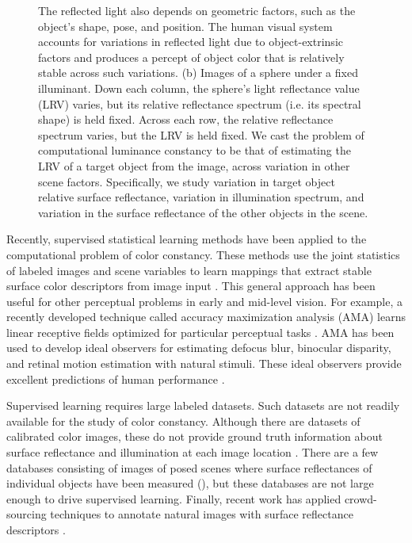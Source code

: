\documentclass{jov}
\begin{document}
\begin{figure}
{The reflected light also depends on geometric factors, such as the object's shape, pose, and position. 
The human visual system accounts for variations in reflected light due to object-extrinsic factors and produces a percept of object color that is relatively stable across such variations. 
(b) Images of a sphere under a fixed illuminant.  
Down each column, the sphere's light reflectance value (LRV) varies, but its relative reflectance spectrum (i.e. its spectral shape) is held fixed.
Across each row, the relative reflectance spectrum varies, but the LRV is held fixed.
We cast the problem of computational luminance constancy to be that of estimating the LRV of a target object from the image, across variation in other scene factors. 
Specifically, we study variation in target object relative surface reflectance, variation in illumination spectrum, and variation in the surface reflectance of the other objects in the scene.}
 \end{figure}

Recently, supervised statistical learning methods have been applied to the computational problem of color constancy.
These methods use the joint statistics of labeled images and scene variables to learn mappings that extract stable surface color descriptors from image input \cite{barron2015convolutional}.
This general approach has been useful for other perceptual problems in early and mid-level vision.
For example, a recently developed technique called accuracy maximization analysis (AMA) learns linear receptive fields optimized for particular perceptual tasks \cite{geisler2009optimal,burge2017accuracy,jaini2017linking}. AMA has been used to develop ideal observers for estimating defocus blur, binocular disparity, and retinal motion estimation with natural stimuli. These ideal observers provide excellent predictions of human performance \cite{burge2011optimal, burge2012optimal, burge2014optimal, burge2015optimal}.

Supervised learning requires large labeled datasets.  Such datasets are not readily available for the study of color constancy. Although there are datasets of calibrated color images, these do not provide ground truth information about surface reflectance and illumination at each image location \cite{ChakrabartiHyperspectral,NascimentoFoster2016,ParragaHyperspectralData,TkacikUpennHypersepctralData,skauli2013collection,olmos2004biologically}. There are a few databases consisting of images of posed scenes where surface reflectances of individual objects have been measured (), but these databases are not large enough to drive supervised learning. Finally, recent work has applied crowd-sourcing techniques to annotate natural images with surface reflectance descriptors \cite{kovacs17shading}.
 
\end{document}
